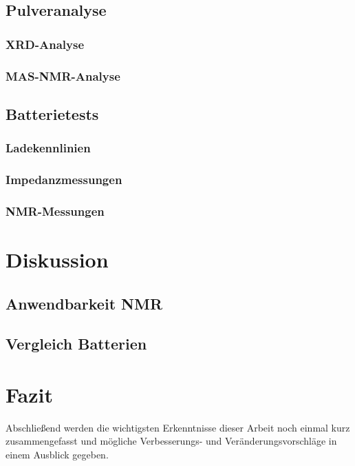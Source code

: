 \documentclass[a4paper, 11pt, headsepline,footsepline,twoside,abstract]{scrbook}
\begin{document}
\section{Pulveranalyse}
\subsection{XRD-Analyse}
\subsection{MAS-NMR-Analyse}
\section{Batterietests}
\subsection{Ladekennlinien}
\subsection{Impedanzmessungen}
\subsection{NMR-Messungen}
\chapter{Diskussion}
\section{Anwendbarkeit NMR}
\section{Vergleich Batterien}
\chapter{Fazit}
Abschließend werden die wichtigsten Erkenntnisse dieser Arbeit noch einmal kurz zusammengefasst und mögliche Verbesserungs- und Veränderungsvorschläge in einem Ausblick gegeben.
\end{document}
